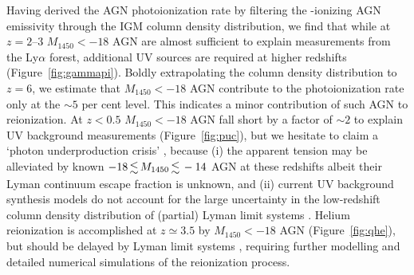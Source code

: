 \documentclass[fleqn,usenatbib]{mnras}
\begin{document}
Having derived the AGN  photoionization rate by filtering the -ionizing AGN emissivity through
the IGM  column density distribution, we find that while at $z=2$--3 $M_{1450}<-18$ AGN are almost sufficient
to explain measurements from the Ly$\alpha$ forest, additional UV sources are required at higher redshifts
(Figure~\ref{fig:gammapi}). Boldly extrapolating the  column density distribution to $z=6$, we estimate that
$M_{1450}<-18$ AGN contribute to the  photoionization rate only at the $\sim 5$ per cent level.
This indicates a minor contribution of such AGN to  reionization.
At $z<0.5$ $M_{1450}<-18$ AGN fall short by a factor of $\sim 2$ to explain UV background measurements
(Figure~\ref{fig:puc}), but we hesitate to claim a `photon underproduction crisis' \citep{2014ApJ...789L..32K},
because (i) the apparent tension may be alleviated by known $-18\la M_{1450}\la -14$ AGN at these redshifts
\citep{2009A&A...507..781S} albeit their Lyman continuum escape fraction is unknown,
and (ii) current UV background synthesis models do not account for the large uncertainty in the low-redshift
column density distribution of (partial)  Lyman limit systems \citep{2011ApJ...736...42R,2017ApJ...849..106S}. 
Helium reionization is accomplished at $z\simeq 3.5$ by $M_{1450}<-18$ AGN (Figure~\ref{fig:qhe}),
but should be delayed by  Lyman limit systems \citep{2009MNRAS.395..736B, 2017ApJ...851...50M},
requiring further modelling and detailed numerical simulations of the  reionization process.
\end{document}
